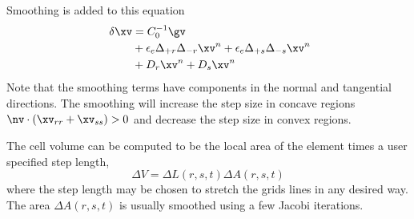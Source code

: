 Smoothing is added to this equation
\begin{align*}
   [ I + C_0^{-1}A_0 \Delta_{0r} - \epsilon_i \Delta_{+r}\Delta_{-r} ]
   [ I + C_0^{-1}B_0 \Delta_{0s} - \epsilon_i \Delta_{+s}\Delta_{-s} ] ~\dxv & = C_0^{-1}\gv  \\
        &+ \epsilon_e \Delta_{+r}\Delta_{-r} \xv^n + \epsilon_e \Delta_{+s}\Delta_{-s} \xv^n \\
        &+ D_r \xv^n + D_s \xv^n
\end{align*}
Note that the smoothing terms have components in the normal and tangential directions. The smoothing will
increase the step size in concave regions $\nv\cdot( \xv_{rr} + \xv_{ss} ) >0 $ and decrease the step size
in convex regions.

The cell volume can be computed to be the local area of the element times a user specified
step length,
\[
    \Delta V = \Delta L(r,s,t) \Delta A(r,s,t)
\]
where the step length may be chosen to stretch the grids lines in any desired way.
The area $\Delta A(r,s,t)$ is usually smoothed using a few Jacobi iterations.


